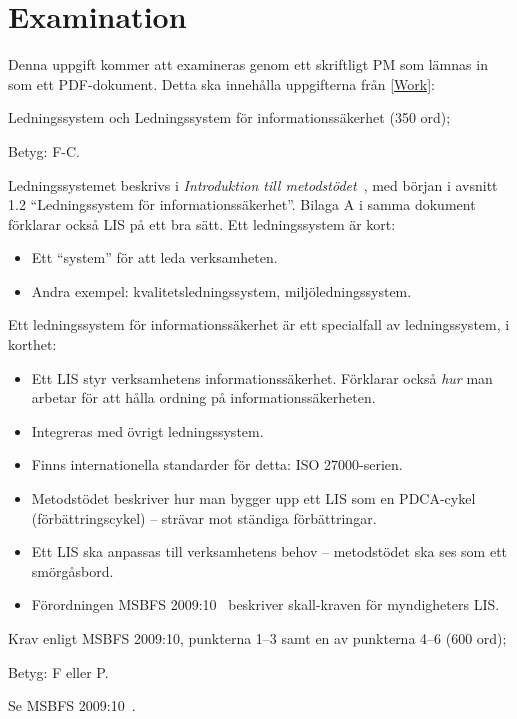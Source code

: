 \documentclass[a4paper]{llncs}
\begin{document}
\section{Examination}
\label{sec:examination}
\noindent
Denna uppgift kommer att examineras genom ett skriftligt PM som lämnas in som 
ett PDF-dokument.
Detta ska innehålla uppgifterna från \cref{Work}:
\begin{exercise}
  Ledningssystem och Ledningssystem för informationssäkerhet (350 ord);
  \begin{solution}
    Betyg: F-C.

    Ledningssystemet beskrivs i \emph{Introduktion till 
      metodstödet}~\cite{MSB2011itm}, med början i avsnitt 1.2 
    \enquote{Ledningssystem för informationssäkerhet}.
    Bilaga A i samma dokument förklarar också LIS på ett bra sätt.
    Ett ledningssystem är kort:
    \begin{itemize}
      \item Ett \enquote{system} för att leda verksamheten.
      \item Andra exempel: kvalitetsledningssystem, miljöledningssystem.
    \end{itemize}

    Ett ledningssystem för informationssäkerhet är ett specialfall av 
    ledningssystem, i korthet:
    \begin{itemize}
      \item Ett LIS styr verksamhetens informationssäkerhet.
        Förklarar också \emph{hur} man arbetar för att hålla ordning på 
        informationssäkerheten.
      \item Integreras med övrigt ledningssystem.
      \item Finns internationella standarder för detta: ISO 27000-serien.
      \item Metodstödet beskriver hur man bygger upp ett LIS som en PDCA-cykel 
        (förbättringscykel) -- strävar mot ständiga förbättringar.
      \item Ett LIS ska anpassas till verksamhetens behov -- metodstödet ska 
        ses som ett smörgåsbord.
      \item Förordningen MSBFS 2009:10~\cite{MSBFS2009:10} beskriver 
        skall-kraven för myndigheters LIS\@.
    \end{itemize}
  \end{solution}
  \end{exercise}

  \begin{exercise}
  Krav enligt MSBFS 2009:10, punkterna 1--3 samt en av punkterna 4--6 (600 
  ord);
  \begin{solution}
    Betyg: F eller P.

    Se MSBFS 2009:10~\cite{MSBFS2009:10}.
  \end{solution}
\end{exercise}
\end{document}
